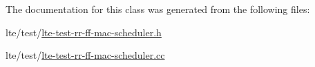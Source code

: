The documentation for this class was generated from the following files\+:\begin{DoxyCompactItemize}
\item 
lte/test/\hyperlink{lte-test-rr-ff-mac-scheduler_8h}{lte-\/test-\/rr-\/ff-\/mac-\/scheduler.\+h}\item 
lte/test/\hyperlink{lte-test-rr-ff-mac-scheduler_8cc}{lte-\/test-\/rr-\/ff-\/mac-\/scheduler.\+cc}\end{DoxyCompactItemize}
